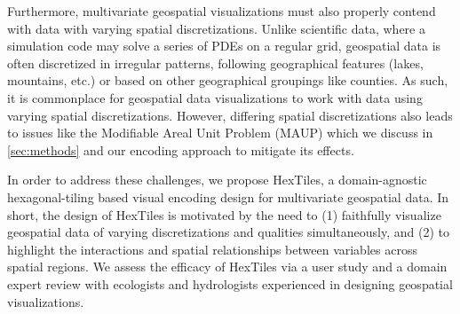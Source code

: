 Furthermore, multivariate geospatial visualizations must also properly contend with data with varying spatial discretizations.
%
%
Unlike scientific data, where a simulation code may solve a series of PDEs on a regular grid, geospatial data is often discretized in irregular patterns, following geographical features (lakes, mountains, etc.) or based on other geographical groupings like counties. 
%
%
As such, it is commonplace for geospatial data visualizations to work with data using varying spatial discretizations.
%
However, differing spatial discretizations also leads to issues like the Modifiable Areal Unit Problem (MAUP) \cite{fotheringham1991modifiable} which we discuss in \cref{sec:methods} and our encoding approach to mitigate its effects.

In order to address these challenges, we propose HexTiles, a domain-agnostic hexagonal-tiling based visual encoding design for multivariate geospatial data.
%
In short, the design of HexTiles is motivated by the need to (1) faithfully visualize geospatial data of varying discretizations and qualities simultaneously, 
and (2) to highlight the interactions and spatial relationships between variables across spatial regions.
%
We assess the efficacy of HexTiles via a user study and a domain expert review with ecologists and hydrologists experienced in designing geospatial visualizations.






